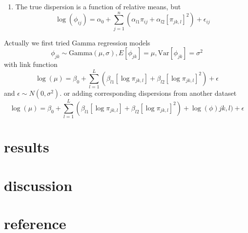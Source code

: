 \documentclass[paper=a4, fontsize=12.5pt]{scrartcl} %
\numberwithin{equation}{section} %
\numberwithin{figure}{section} %
\numberwithin{table}{section} %
\begin{document}
   \begin{enumerate}
   \item The true dispersion is a function of relative means, but 
   \[\log(\phi_{ij})= \alpha_0 + \sum_{j=1}^n(\alpha_{l1}\pi_{ij} + \alpha_{l2}[\pi_{jk, l}]^2) + \epsilon_{ij} \]
   \end{enumerate}

   	
	Actually we first tried Gamma regression models
	\[\phi_{jk} \sim \text{Gamma}(\mu, \sigma), E[\phi_{jk}]=\mu,  \text{Var}[\phi_{jk}] = \sigma^2\]
	with link function 
	\[\log(\mu)=\beta_0 +\sum_{l=1}^L(\beta_{l1}[\log\pi_{jk, l}] + \beta_{l2}[\log\pi_{jk, l}]^2) + \epsilon\]
	and $\epsilon\sim N(0, \sigma^2)$.
	or adding corresponding dispersions from another dataset
	\[\log(\mu)=\beta_0 +\sum_{l=1}^L(\beta_{l1}[\log\pi_{jk, l}] + \beta_{l2}[\log\pi_{jk, l}]^2) + \log(\phi){jk, l}) + \epsilon\]
  \section{results}
  \section{discussion}
  \section{reference}
\end{document}
